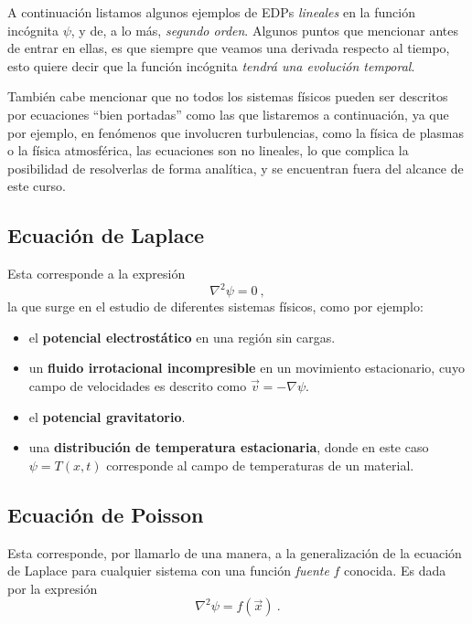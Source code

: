 A continuación listamos algunos ejemplos de EDPs \emph{lineales} en la función incógnita $\psi$, y de, a lo más, \emph{segundo orden}. Algunos puntos que mencionar antes de entrar en ellas, es que siempre que veamos una derivada respecto al tiempo, esto quiere decir que la función incógnita \emph{tendrá una evolución temporal}. 

También cabe mencionar que no todos los sistemas físicos pueden ser descritos por ecuaciones ``bien portadas'' como las que listaremos a continuación, ya que por ejemplo, en fenómenos que involucren turbulencias, como la física de plasmas o la física atmosférica, las ecuaciones son no lineales, lo que complica la posibilidad de resolverlas de forma analítica, y se encuentran fuera del alcance de este curso.

\subsection*{Ecuación de Laplace}

Esta corresponde a la expresión
\begin{equation}
    \nabla^2 \psi = 0 \ ,
\end{equation}
la que surge en el estudio de diferentes sistemas físicos, como por ejemplo:
\begin{itemize}
    \item el \textbf{potencial electrostático} en una región sin cargas. 
    \item un \textbf{fluido irrotacional incompresible} en un movimiento estacionario, cuyo campo de velocidades es descrito como $\vec{v} = -\nabla \psi$.
    \item el \textbf{potencial gravitatorio}.
    \item una \textbf{distribución de temperatura estacionaria}, donde en este caso $\psi = T(x,t)$ corresponde al campo de temperaturas de un material.
\end{itemize}

\subsection*{Ecuación de Poisson}

Esta corresponde, por llamarlo de una manera, a la generalización de la ecuación de Laplace para cualquier sistema con una función \emph{fuente} $f$ conocida. Es dada por la expresión
\begin{equation}
    \nabla^2\psi = f(\vec{x}) \ .
\end{equation}

